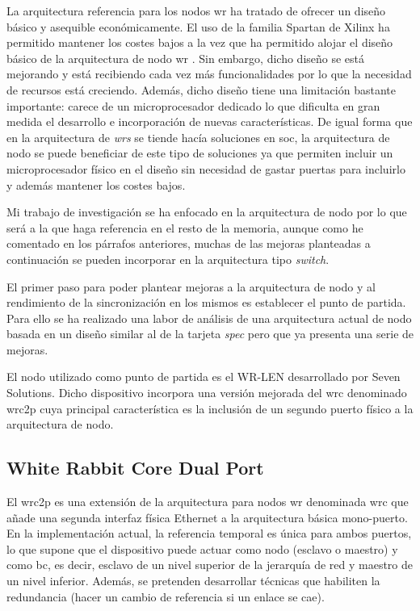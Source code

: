 La arquitectura referencia para los nodos \gls{wr} ha tratado de ofrecer un 
diseño básico y asequible económicamente. El uso de la familia Spartan de 
Xilinx ha permitido mantener los costes bajos a la vez que ha permitido alojar 
el diseño básico de la arquitectura de nodo \gls{wr} . Sin embargo, dicho 
diseño se está mejorando y está recibiendo cada vez más funcionalidades por lo 
que la necesidad de recursos está creciendo. Además, dicho diseño tiene una 
limitación bastante importante: carece de un microprocesador dedicado lo que 
dificulta en gran medida el desarrollo e incorporación de nuevas 
características. De igual forma que en la arquitectura de \textit{wrs} se 
tiende hacía soluciones en \gls{soc}, la arquitectura de nodo se puede 
beneficiar de este tipo de soluciones ya que permiten incluir un 
microprocesador físico en el diseño sin necesidad de gastar puertas para 
incluirlo y además mantener los costes bajos.

Mi trabajo de investigación se ha enfocado en la arquitectura de nodo por lo 
que será a la que haga referencia en el resto de la memoria, aunque como he 
comentado en los párrafos anteriores, muchas de las mejoras planteadas a 
continuación se pueden incorporar en la arquitectura tipo \textit{switch}.

El primer paso para poder plantear mejoras a la arquitectura de nodo y al 
rendimiento de la sincronización en los mismos es establecer el punto de 
partida. Para ello se ha realizado una labor de análisis de una arquitectura 
actual de nodo basada en un diseño similar al de la tarjeta \textit{spec} pero 
que ya presenta una serie de mejoras.

El nodo utilizado como punto de partida es el WR-LEN \cite{website:len}
desarrollado por Seven Solutions. Dicho dispositivo incorpora una versión 
mejorada del \gls{wrc} denominado \gls{wrc2p} cuya principal característica es 
la inclusión de un segundo puerto físico a la arquitectura de nodo.

\subsection{White Rabbit Core Dual Port}

El \gls{wrc2p} \cite{felipe16} es una extensión de la arquitectura para nodos 
\gls{wr} 
denominada \acrlong{wrc}  que añade una segunda interfaz física 
Ethernet a la arquitectura básica mono-puerto. En la implementación actual, la 
referencia temporal es única para ambos puertos, lo que supone que el 
dispositivo puede actuar como nodo (esclavo o maestro) y como \gls{bc}, es 
decir, esclavo de un nivel superior de la jerarquía de red y maestro de un 
nivel inferior. Además, se pretenden desarrollar técnicas que habiliten la 
redundancia (hacer un cambio de referencia si un enlace se cae). 

